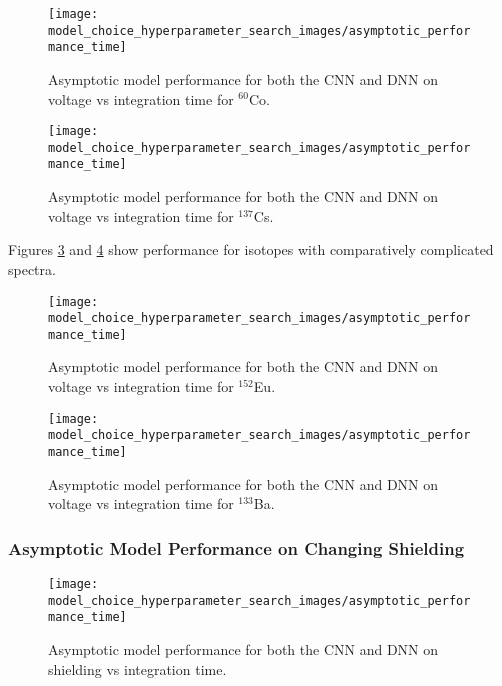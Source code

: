 \begin{figure}[H]
	\centering
	\texttt{[image: model\_choice\_hyperparameter\_search\_images/asymptotic\_performance\_time]}
	\caption{Asymptotic model performance for both the CNN and DNN on voltage vs integration time for $^{60}$Co.}
	\label{fig:model_asymptotic_performance_co60}
\end{figure}

\begin{figure}[H]
	\centering
	\texttt{[image: model\_choice\_hyperparameter\_search\_images/asymptotic\_performance\_time]}
	\caption{Asymptotic model performance for both the CNN and DNN on voltage vs integration time for $^{137}$Cs.}
	\label{fig:model_asymptotic_performance_cs137}
\end{figure}

Figures \ref{fig:model_asymptotic_performance_eu152} and \ref{fig:model_asymptotic_performance_ba133} show performance for isotopes with comparatively complicated spectra.

\begin{figure}[H]
	\centering
	\texttt{[image: model\_choice\_hyperparameter\_search\_images/asymptotic\_performance\_time]}
	\caption{Asymptotic model performance for both the CNN and DNN on voltage vs integration time for $^{152}$Eu.}
	\label{fig:model_asymptotic_performance_eu152}
\end{figure}

\begin{figure}[H]
	\centering
	\texttt{[image: model\_choice\_hyperparameter\_search\_images/asymptotic\_performance\_time]}
	\caption{Asymptotic model performance for both the CNN and DNN on voltage vs integration time for $^{133}$Ba.}
	\label{fig:model_asymptotic_performance_ba133}
\end{figure}

\subsubsection{Asymptotic Model Performance on Changing Shielding}

\begin{figure}[H]
	\centering
	\texttt{[image: model\_choice\_hyperparameter\_search\_images/asymptotic\_performance\_time]}
	\caption{Asymptotic model performance for both the CNN and DNN on shielding vs integration time.}
	\label{fig:asymptotic_performance}
\end{figure}



